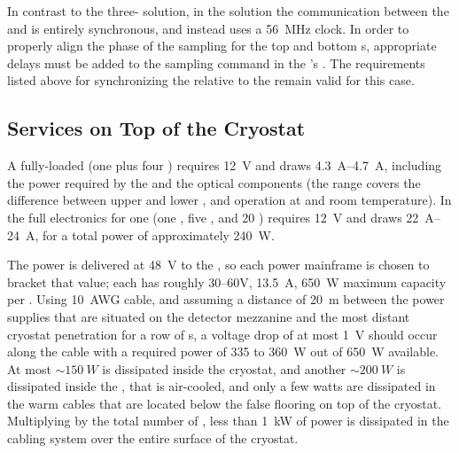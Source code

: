 In contrast to the three- solution, 
in the  solution 
the communication between the  and 
 is entirely synchronous, and instead uses a \SI{56}{MHz} 
clock. In order to properly align the phase of the
 sampling for the top and bottom s,
appropriate delays must be added to the sampling
command in the 's . 
The requirements listed above for synchronizing 
the  relative to the  remain
valid for this case. 

\subsection{Services on Top of the Cryostat}
\label{sec:fdsp-tpcelec-design-services}

A fully-loaded  (one  plus four ) 
requires \SI{12}{V} and draws \SIrange{4.3}{4.7}{A}, including the
power required by the  and the optical components (the range 
covers the difference between upper and lower , and operation
at \lntwo and room temperature). In 
 the full electronics for one  (one , 
five , and \num{20} ) requires \SI{12}{V} and 
draws \SIrange{22}{24}{A}, for a total power of approximately 
\SI{240}{W}. 

The  power is delivered at \SI{48}{V} to the , 
so each  power mainframe is chosen to bracket that value; 
each has roughly \numrange{30}{60}{V}, \SI{13.5}{A}, \SI{650}{W} 
maximum capacity per . Using \SI{10}{AWG} cable, and assuming
a distance of \SI{20}{m} between the  power supplies 
that are situated on the detector mezzanine and the most distant
cryostat penetration for a row of s, a voltage
drop of at most \SI{1}{V} should occur along the cable with a required power of 
\num{335} to \SI{360}{W} out of \SI{650}{W} available.
At most $\sim\SI{150}{W}$ is dissipated inside the cryostat, and another
$\sim\SI{200}{W}$ is dissipated inside the , that is
air-cooled, and only a few watts are dissipated in the warm cables
that are located below the false flooring on top of the cryostat.
Multiplying by the total number of , less 
than \SI{1}{kW} of power is dissipated in the cabling system 
over the entire surface of the cryostat. 

